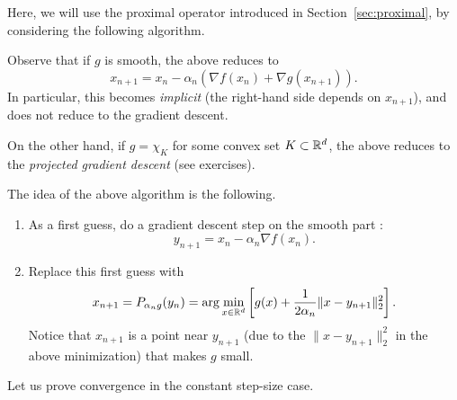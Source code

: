 \documentclass{report}
\begin{document}
Here, we will use the proximal operator introduced in Section~\ref{sec:proximal}, by considering the following algorithm.


\begin{remark}
	Observe that if $g$ is smooth, the above reduces to 
	\begin{equation}
		x_{n+1} =  x_n - \alpha_n\left( \nabla f(x_n) + \nabla g(x_{n+1})\right).
	\end{equation}
	In particular, this becomes \emph{implicit} (the right-hand side depends on $x_{n+1}$), and does not reduce to the gradient descent.
	
	On the other hand, if $g=\chi_K$ for some convex set $K\subset \mathbb{R}^d$, the above reduces to the \emph{projected gradient descent} (see exercises).
\end{remark}
	
The idea of the above algorithm is the following. 
\begin{enumerate}
	\item As a first guess, do a gradient descent step on the smooth part :
	\begin{equation}
		y_{n+1} =x_n - \alpha_n\nabla f(x_n).
	\end{equation}
	\item Replace this first guess with 
	\begin{equation}
		x_{n+1} = P_{\alpha_n g}(y_n) = \arg\min_{x\in \mathbb{R}^{d}}\left[ g(x) + \frac{1}{2\alpha_n}\|x-y_{n+1}\|_2^2 \right].
	\end{equation}
	Notice that $x_{n+1}$ is a point near $y_{n+1}$ (due to the $\|x-y_{n+1}\|_2^2$ in the above minimization) that makes $g$ small.
\end{enumerate}

Let us prove convergence in the constant step-size case.

\end{document}
